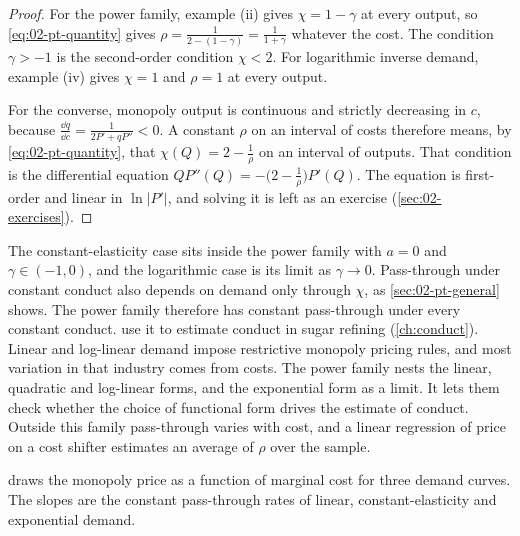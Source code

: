 \begin{proof}
For the power family, example (ii) gives $\chi = 1 - \gamma$ at every output, so \eqref{eq:02-pt-quantity}
gives $\rho = \frac{1}{2 - (1 - \gamma)} = \frac{1}{1 + \gamma}$ whatever the cost. The condition
$\gamma > -1$ is the second-order condition $\chi < 2$. For logarithmic inverse demand, example (iv) gives
$\chi = 1$ and $\rho = 1$ at every output.

For the converse, monopoly output is continuous and strictly decreasing in $c$, because
$\frac{\dd q}{\dd c} = \frac{1}{2P' + qP''} < 0$. A constant $\rho$ on an interval of costs therefore means, by
\eqref{eq:02-pt-quantity}, that $\chi(Q) = 2 - \frac{1}{\rho}$ on an interval of outputs. That condition is the
differential equation $QP''(Q) = -\bigl(2 - \frac{1}{\rho}\bigr)P'(Q)$. The equation is first-order and linear in
$\ln\lvert P'\rvert$, and solving it is left as an exercise (\cref{sec:02-exercises}).
\end{proof}

The constant-elasticity case sits inside the power family with $a = 0$ and $\gamma \in (-1, 0)$, and the
logarithmic case is its limit as $\gamma \to 0$. Pass-through under constant conduct also depends on demand only
through $\chi$, as \cref{sec:02-pt-general} shows. The power family therefore has constant pass-through under
every constant conduct. \citet{GenesoveMullin1998} use it to estimate conduct in sugar refining
(\cref{ch:conduct}). Linear and log-linear demand impose restrictive monopoly pricing rules, and most variation in
that industry comes from costs. The power family nests the linear, quadratic and log-linear forms, and the
exponential form as a limit. It lets them check whether the choice of functional form drives the estimate of
conduct.
Outside this family pass-through varies with cost, and a linear regression of price on a cost
shifter estimates an average of $\rho$ over the sample.

 draws the monopoly price as a function of marginal cost for three demand curves. The
slopes are the constant pass-through rates of linear, constant-elasticity and exponential demand.

